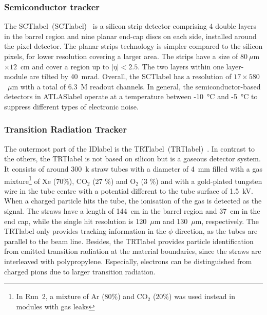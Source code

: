 \subsubsection*{Semiconductor tracker}

The \acrlong{SCTlabel}~(\acrshort{SCTlabel})~\cite{HABER1998161,SCTperformance} is a silicon strip detector comprising 4 double layers in the barrel region and nine planar end-cap discs on each side, installed around the pixel detector. The planar strips technology is simpler compared to the silicon pixels, for lower resolution covering a larger area. The strips have a size of $80~\mu$m$\times 12$~cm and cover a region up to $|\eta|<2.5$. The two layers within one layer-module are tilted by 40~mrad. Overall, the \acrshort{SCTlabel} has a resolution of $17\times 580$~$\mu$m with a total of 6.3~M readout channels. In general, the semiconductor-based detectors in \acrshort{ATLASlabel} operate at a temperature between -10~°C and -5~°C to suppress different types of electronic noise.


\subsubsection*{Transition Radiation Tracker}

The outermost part of the \acrshort{IDlabel} is the \acrlong{TRTlabel}~(\acrshort{TRTlabel})~\cite{MITSOU_2004,TRTRun1}. In contrast to the others, the \acrshort{TRTlabel} is not based on silicon but is a gaseous detector system. It consists of around 300~k straw tubes with a diameter of 4~mm filled with a gas mixture\footnote{In Run~2, a mixture of Ar (80\%) and CO$_2$ (20\%) was used instead in modules with gas leaks} of Xe (70\%), CO$_2$ (27 \%) and O$_2$ (3 \%) and with a gold-plated tungsten wire in the tube centre with a potential different to the tube surface of 1.5~kV. When a charged particle hits the tube, the ionisation of the gas is detected as the signal. The straws have a length of 144~cm in the barrel region and 37~cm in the end cap, while the single hit resolution is 120~$\mu$m and 130~$\mu$m, respectively. The \acrshort{TRTlabel} only provides tracking information in the $\phi$ direction, as the tubes are parallel to the beam line. Besides, the \acrshort{TRTlabel} provides particle identification from emitted transition radiation at the material boundaries, since the straws are interleaved with polypropylene. Especially, electrons can be distinguished from charged pions due to larger transition radiation.


